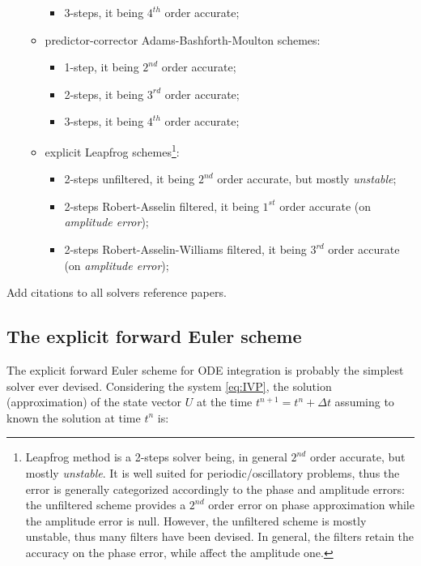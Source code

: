 \documentclass[pdftex,preprint,3p,times,numbers]{elsarticle}
\begin{document}
\begin{itemize}
\begin{itemize}
\begin{itemize}
          \item 3-steps, it being $4^{th}$ order accurate;
          \end{itemize}
      \item predictor-corrector Adams-Bashforth-Moulton schemes:
        \begin{itemize}
          \item 1-step, it being $2^{nd}$ order accurate;
          \item 2-steps, it being $3^{rd}$ order accurate;
          \item 3-steps, it being $4^{th}$ order accurate;
          \end{itemize}
      \item explicit Leapfrog schemes\footnote{Leapfrog method is a 2-steps solver being, in general $2^{nd}$ order accurate, but mostly \emph{unstable}. It is well suited for periodic/oscillatory problems, thus the error is generally categorized accordingly to the phase and amplitude errors: the unfiltered scheme provides a $2^{nd}$ order error on phase approximation while the amplitude error is null. However, the unfiltered scheme is mostly unstable, thus many filters have been devised. In general, the filters retain the accuracy on the phase error, while affect the amplitude one.}:
        \begin{itemize}
          \item 2-steps unfiltered, it being $2^{nd}$ order accurate, but mostly \emph{unstable};
          \item 2-steps Robert-Asselin filtered, it being $1^{st}$ order accurate (on \emph{amplitude error});
          \item 2-steps Robert-Asselin-Williams filtered, it being $3^{rd}$ order accurate (on \emph{amplitude error});
          \end{itemize}
      \end{itemize}
  \end{itemize}

{\color{red} Add citations to all solvers reference papers.}

\subsection{The explicit forward Euler scheme}

The explicit forward Euler scheme for ODE integration is probably the simplest solver ever devised. Considering the system \ref{eq:IVP}, the solution (approximation) of the state vector $U$ at the time $t^{n+1}=t^n+\Delta t$ assuming to known the solution at time $t^n$ is:
\end{document}
